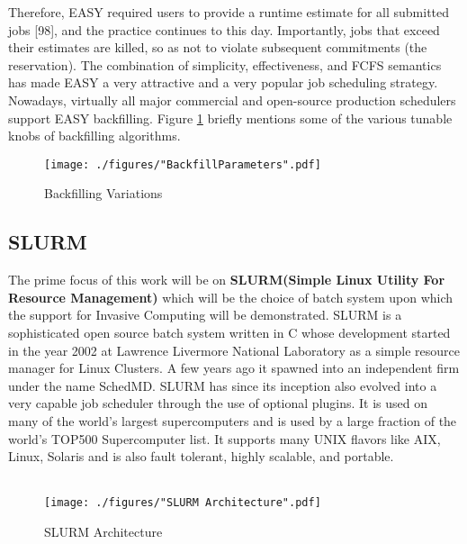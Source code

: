 Therefore, EASY required users to provide a runtime estimate for all submitted jobs [98], and the practice continues to this day. Importantly, jobs that exceed their estimates are killed, so as not to violate subsequent commitments (the reservation). The combination of simplicity, effectiveness, and FCFS semantics has made EASY a very attractive and a very popular job scheduling strategy. Nowadays, virtually all major commercial and open-source production schedulers support EASY backfilling. Figure \ref{fig:3} briefly mentions some of the various tunable knobs of backfilling algorithms.
\begin{figure}[!htbp]
\centering
\texttt{[image: ./figures/"BackfillParameters".pdf]}
\caption{Backfilling Variations}
\label{fig:3}
\end{figure}
\subsection{SLURM}
The prime focus of this work will be on \textbf{SLURM(Simple Linux Utility For Resource Management)} which will be the choice of batch system upon which the support for Invasive Computing will be demonstrated. SLURM is a sophisticated open source batch system written in C whose development started in the year 2002 at Lawrence Livermore National Laboratory as a simple resource manager for Linux Clusters. A few years ago it spawned into an independent firm under the name SchedMD. SLURM has since its inception also evolved into a very capable job scheduler through the use of optional plugins. It is used on many of the world's largest supercomputers and is used by a large fraction of the world's TOP500 Supercomputer list. It supports many UNIX flavors like AIX, Linux, Solaris and is also fault tolerant, highly scalable, and portable.\\ \\
\begin{figure}[!ht]
\centering
\texttt{[image: ./figures/"SLURM Architecture".pdf]}
\caption{SLURM Architecture}
\label{fig:6}
\end{figure}
\noindent
